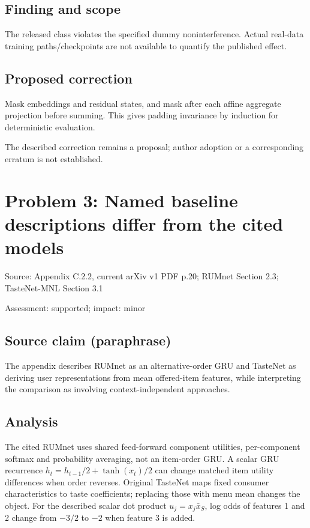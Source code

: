 \documentclass[11pt]{article}
\begin{document}
\subsection*{Finding and scope}

The released class violates the specified dummy noninterference. Actual real-data training paths/checkpoints are not available to quantify the published effect.

\subsection*{Proposed correction}

Mask embeddings and residual states, and mask after each affine aggregate projection before summing. This gives padding invariance by induction for deterministic evaluation.

The described correction remains a proposal; author adoption or a corresponding erratum is not established.

\section*{Problem 3: Named baseline descriptions differ from the cited models}

Source: Appendix C.2.2, current arXiv v1 PDF p.20; RUMnet Section 2.3; TasteNet-MNL Section 3.1

Assessment: supported; impact: minor

\subsection*{Source claim (paraphrase)}

The appendix describes RUMnet as an alternative-order GRU and TasteNet as deriving user representations from mean offered-item features, while interpreting the comparison as involving context-independent approaches.

\subsection*{Analysis}

The cited RUMnet uses shared feed-forward component utilities, per-component softmax and probability averaging, not an item-order GRU. A scalar GRU recurrence \(h_t=h_{t-1}/2+\tanh(x_t)/2\) can change matched item utility differences when order reverses. Original TasteNet maps fixed consumer characteristics to taste coefficients; replacing those with menu mean changes the object. For the described scalar dot product \(u_j=x_j\bar x_S\), log odds of features 1 and 2 change from \(-3/2\) to \(-2\) when feature 3 is added.
\end{document}
